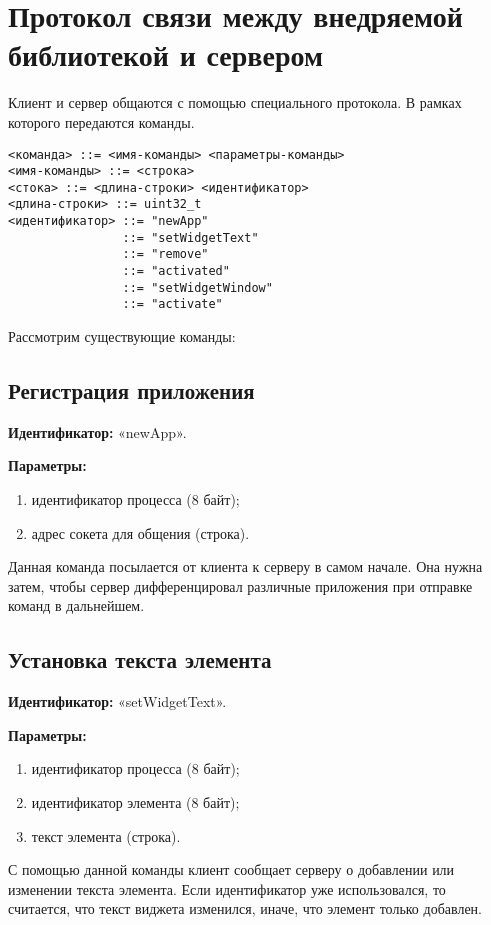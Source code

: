 \section{Протокол связи между внедряемой библиотекой и сервером}

Клиент и сервер общаются с помощью специального протокола. В рамках которого
передаются команды.

\begin{verbatim}
<команда> ::= <имя-команды> <параметры-команды>
<имя-команды> ::= <строка>
<стока> ::= <длина-строки> <идентификатор>
<длина-строки> ::= uint32_t
<идентификатор> ::= "newApp"
                ::= "setWidgetText"
                ::= "remove"
                ::= "activated"
                ::= "setWidgetWindow"
                ::= "activate"
\end{verbatim}

Рассмотрим существующие команды:

\subsection{Регистрация приложения}

\textbf{Идентификатор:} «newApp».

\textbf{Параметры:}
\begin{enumerate}
\item идентификатор процесса (8 байт);
\item адрес сокета для общения (строка).
\end{enumerate}

Данная команда посылается от клиента к серверу в самом начале. Она нужна затем,
чтобы сервер дифференцировал различные приложения при отправке команд в
дальнейшем.

\subsection{Установка текста элемента}

\textbf{Идентификатор:} «setWidgetText».

\textbf{Параметры:}
\begin{enumerate}
\item идентификатор процесса (8 байт);
\item идентификатор элемента (8 байт);
\item текст элемента (строка).
\end{enumerate}

С помощью данной команды клиент сообщает серверу о добавлении или изменении
текста элемента. Если идентификатор уже использовался, то считается, что текст
виджета изменился, иначе, что элемент только добавлен.

